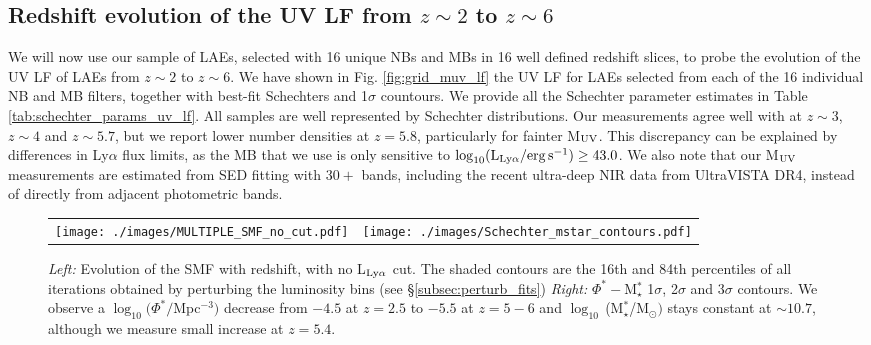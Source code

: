 \documentclass[a4paper,fleqn,usenatbib]{mnras}
\begin{document}
\subsection{Redshift evolution of the UV LF from $z\sim2$ to $z\sim6$}

We will now use our sample of LAEs, selected with 16 unique NBs and MBs in 16 well defined redshift slices, to probe the evolution of the UV LF of LAEs from $z\sim2$ to $z\sim6$. We have shown in  Fig. \ref{fig:grid_muv_lf} the UV LF for LAEs selected from each of the 16 individual NB and MB filters, together with best-fit Schechters and 1$\sigma$ countours. We provide all the Schechter parameter estimates in Table \ref{tab:schechter_params_uv_lf}. All samples are well represented by Schechter distributions. Our measurements agree well with \cite{Ouchi2008} at $z\sim3$, $z\sim4$ and $z\sim5.7$, but we report lower number densities at $z=5.8$, particularly for fainter M$_{\rm UV}$. This discrepancy can be explained by differences in Ly$\alpha$ flux limits, as the MB that we use is only sensitive to $\log_{10} (\rm L_{Ly\alpha}/erg\,s^{-1}) \geq 43.0$. We also note that our M$_{\rm UV}$ measurements are estimated from SED fitting with $30+$ bands, including the recent ultra-deep NIR data from UltraVISTA DR4, instead of directly from adjacent photometric bands.

%
%
\begin{figure*}
\begin{tabular}{ll}
  \centering
  \texttt{[image: ./images/MULTIPLE\_SMF\_no\_cut.pdf]}
  &
  \texttt{[image: ./images/Schechter\_mstar\_contours.pdf]}  
\end{tabular}
  \caption{{\it Left:} Evolution of the SMF with redshift, with no L$_{\rm Ly\alpha}$ cut. The shaded contours are the 16th and 84th percentiles of all iterations obtained by perturbing the luminosity bins (see \S\ref{subsec:perturb_fits}) {\it Right:} $\Phi^*-$M$_\star^*$ 1$\sigma$, 2$\sigma$ and 3$\sigma$ contours. We observe a $\log_{10}(\Phi^*/$Mpc$^{-3})$ decrease from $-4.5$ at $z=2.5$ to $-5.5$ at $z=5-6$ and $\log_{10}\,$(M$_\star^*$/M$_{\odot})$ stays constant at $\sim10.7$, although we measure small increase at $z=5.4$.}
  \label{fig:multiple_smf_no_cut}
\end{figure*}
\end{document}
